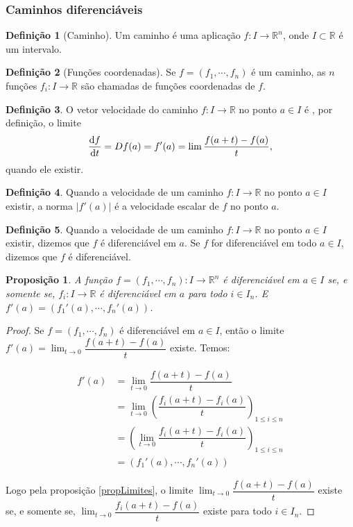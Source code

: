 \documentclass{article}
\newtheorem{prop}{Proposição}[section]
\theoremstyle{theorem}
\theoremstyle{lemma}
\theoremstyle{definition}
\newtheorem{definicao}{Definição}[section]
\theoremstyle{remark}
\begin{document}
   \subsubsection{ Caminhos diferenciáveis}
   \begin{definicao}[Caminho]
	   Um caminho é uma aplicação $f: I \to \mathbb{R}^n$, onde $I \subset\mathbb{R}$ é um intervalo.
   \end{definicao}
   \begin{definicao}[Funções coordenadas]
	Se $f = (f_1,\cdots, f_n)$ é um caminho, as $n$ funções $f_i : I \to \mathbb{R}$ são chamadas de funções coordenadas de $f$.
   \end{definicao}
   \begin{definicao}
	   O vetor velocidade do caminho $f:I\to \mathbb{R}$ no ponto $a\in I$ é , por definição, o limite \[ \dv{f}{t}(a) = Df(a) = f'(a) = \lim \dfrac{f(a+t) - f(a)}{t},\]
	   quando ele existir. 
   \end{definicao}
   \begin{definicao}
	   Quando a velocidade de um caminho $f:I\to \mathbb{R}$ no ponto $a\in I$ existir, a norma $|f'(a)|$ é a velocidade escalar de $f$ no ponto $a$.
   \end{definicao}
   \begin{definicao}
	   Quando a velocidade de um caminho $f:I\to \mathbb{R}$ no ponto $a\in I$ existir, dizemos que $f$ é diferenciável em $a$. Se $f$ for diferenciável em todo $a\in I$, dizemos que $f$ é diferenciável.
   \end{definicao}
   \begin{prop}
	   A função $f = (f_1,\cdots, f_n) : I \to \mathbb{R}^n$ é diferenciável em $a\in I$ se, e somente se, $f_i : I \to \mathbb{R}$ é diferenciável em $a$ para todo $i\in I_n$.  E $f'(a) = ( f_1'(a), \cdots, f_n'(a))$.
   \end{prop}
   \begin{proof}
	   Se $f = (f_1,\cdots, f_n)$ é diferenciável em $a\in I$, então o limite $f'(a) = \displaystyle\lim_{t\to 0} \dfrac{f(a+t) - f(a)}{t}$ existe. Temos:

	   \begin{align*}
		   f'(a) &= \lim_{t\to 0} \dfrac{f(a+t) - f(a)}{t} \\
		   &= \lim_{t \to 0} \left( \dfrac{f_i(a+t) - f_i(a)}{t}\right)_{1\leq i \leq n}\\
		   &=  \left(\lim_{t \to 0} \dfrac{f_i(a+t) - f_i(a)}{t}\right)_{1\leq i \leq n}\\
		   &=(f_1'(a),\cdots, f_n'(a))
	   \end{align*}

	   Logo pela proposição \ref{propLimites}, o limite  \(\displaystyle\lim_{t\to 0} \dfrac{f(a+t) - f(a)}{t}\) existe se, e somente se, \(\displaystyle\lim_{t\to 0} \dfrac{f_i(a+t) - f(a)}{t}\) existe para todo \(i\in I_n\).
   \end{proof}
\end{document}
